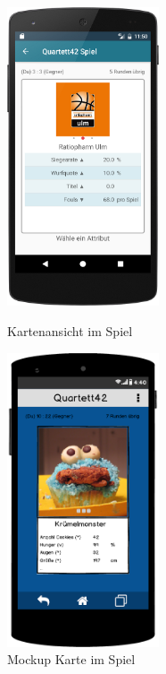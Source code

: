 \begin{figure}[h]
    \centering
    \begin{minipage}{0.49\textwidth}
        \centering
        \includegraphics[width=0.4\textwidth]{img/screenshots/device_select_attr.png}
		\caption{Kartenansicht im Spiel}
		\label{figure:implementierungspiel1}
    \end{minipage}
    \begin{minipage}{0.49\textwidth}
        \centering
        \includegraphics[width=0.4\textwidth]{img/mockups/spiel_attributauswahl.png}
        \caption{Mockup Karte im Spiel}
    \end{minipage}
\end{figure}


